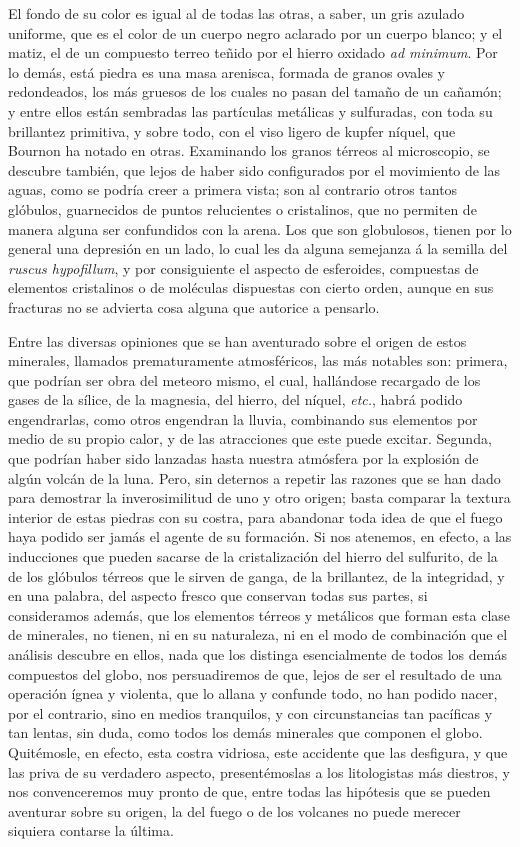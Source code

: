 \documentclass[a4paper, 11pt, oneside, polutonikogreek, spanish]{article}
\begin{document}
El fondo de su color es igual al de todas las otras, a saber, un gris azulado uniforme, que es el color de un cuerpo negro aclarado por un cuerpo blanco; y el matiz, el de un compuesto terreo teñido por el hierro oxidado \emph{ad minimum}. Por lo demás, está piedra es una masa arenisca, formada de granos ovales y redondeados, los más gruesos de los cuales no pasan del tamaño de un cañamón; y entre ellos están sembradas las partículas metálicas y sulfuradas, con toda su brillantez primitiva, y sobre todo, con el viso ligero de kupfer níquel, que Bournon ha notado en otras. Examinando los granos térreos al microscopio, se descubre también, que lejos de haber sido configurados por el movimiento de las aguas, como se podría creer a primera vista; son al contrario otros tantos glóbulos, guarnecidos de puntos relucientes o cristalinos, que no permiten de manera alguna ser confundidos con la arena. Los que son globulosos, tienen por lo general una depresión en un lado, lo cual les da alguna semejanza á la semilla del \emph{ruscus hypofillum}, y por consiguiente el aspecto de esferoides, compuestas de elementos cristalinos o de moléculas dispuestas con cierto orden, aunque en sus fracturas no se advierta cosa alguna que autorice a pensarlo.

Entre las diversas opiniones que se han aventurado sobre el origen de estos minerales, llamados prematuramente atmosféricos, las más notables son: primera, que podrían ser obra del meteoro mismo, el cual, hallándose recargado de los gases de la sílice, de la magnesia, del hierro, del níquel, \emph{etc.}, habrá podido engendrarlas, como otros engendran la lluvia, combinando sus elementos por medio de su propio calor, y de las atracciones que este puede excitar. Segunda, que podrían haber sido lanzadas hasta nuestra atmósfera por la explosión de algún volcán de la luna. Pero, sin deternos a repetir las razones que se han dado para demostrar la inverosimilitud de uno y otro origen; basta comparar la textura interior de estas piedras con su costra, para abandonar toda idea de que el fuego haya podido ser jamás el agente de su formación. Si nos atenemos, en efecto, a las inducciones que pueden sacarse de la cristalización del hierro del sulfurito, de la de los glóbulos térreos que le sirven de ganga, de la brillantez, de la integridad, y en una palabra, del aspecto fresco que conservan todas sus partes, si consideramos además, que los elementos térreos y metálicos que forman esta clase de minerales, no tienen, ni en su naturaleza, ni en el modo de combinación que el análisis descubre en ellos, nada que los distinga esencialmente de todos los demás compuestos del globo, nos persuadiremos de que, lejos de ser el resultado de una operación ígnea y violenta, que lo allana y confunde todo, no han podido nacer, por el contrario, sino en medios tranquilos, y con circunstancias tan pacíficas y tan lentas, sin duda, como todos los demás minerales que componen el globo. Quitémosle, en efecto, esta costra vidriosa, este accidente que las desfigura, y que las priva de su verdadero aspecto, presentémoslas a los litologistas más diestros, y nos convenceremos muy pronto de que, entre todas las hipótesis que se pueden aventurar sobre su origen, la del fuego o de los volcanes no puede merecer siquiera contarse la última.
\end{document}
